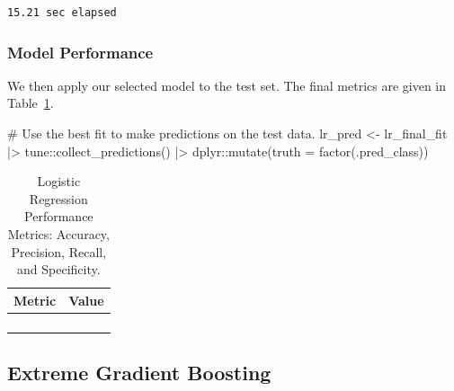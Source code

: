 \documentclass[
  letterpaper,
  DIV=11,
  numbers=noendperiod]{scrartcl}
\newenvironment{Shaded}{\begin{snugshade}}{\end{snugshade}}
\newcommand{\AttributeTok}[1]{\textcolor[rgb]{0.40,0.45,0.13}{#1}}
\newcommand{\CommentTok}[1]{\textcolor[rgb]{0.37,0.37,0.37}{#1}}
\newcommand{\FunctionTok}[1]{\textcolor[rgb]{0.28,0.35,0.67}{#1}}
\newcommand{\NormalTok}[1]{\textcolor[rgb]{0.00,0.23,0.31}{#1}}
\newcommand{\OtherTok}[1]{\textcolor[rgb]{0.00,0.23,0.31}{#1}}
\newcommand{\SpecialCharTok}[1]{\textcolor[rgb]{0.37,0.37,0.37}{#1}}
\begin{document}
\begin{verbatim}
15.21 sec elapsed
\end{verbatim}

\subsubsection{Model Performance}\label{model-performance-3}

We then apply our selected model to the test set. The final metrics are
given in Table~\ref{tbl-lr-performance-pdf}.

\begin{Shaded}
\begin{Highlighting}[]
\CommentTok{\# Use the best fit to make predictions on the test data.}
\NormalTok{lr\_pred }\OtherTok{\textless{}{-}} 
\NormalTok{  lr\_final\_fit }\SpecialCharTok{|\textgreater{}} 
\NormalTok{  tune}\SpecialCharTok{::}\FunctionTok{collect\_predictions}\NormalTok{() }\SpecialCharTok{|\textgreater{}}
\NormalTok{  dplyr}\SpecialCharTok{::}\FunctionTok{mutate}\NormalTok{(}\AttributeTok{truth =} \FunctionTok{factor}\NormalTok{(.pred\_class))}
\end{Highlighting}
\end{Shaded}

\begin{longtable}{>{\raggedright\arraybackslash}p{}>{\raggedleft\arraybackslash}p{}}

\caption{\label{tbl-lr-performance-pdf}Logistic Regression Performance
Metrics: Accuracy, Precision, Recall, and Specificity.}

\tabularnewline

\toprule
Metric & Value \\ 
\midrule\addlinespace[2.5pt]
\cellcolor[HTML]{FFFFFF}{Accuracy} & \cellcolor[HTML]{FFFFFF}{93.4} \\ 
\cellcolor[HTML]{FFFFFF}{Precision} & \cellcolor[HTML]{FFFFFF}{84.6} \\ 
\cellcolor[HTML]{FFFFFF}{Recall} & \cellcolor[HTML]{FFFFFF}{91.7} \\ 
\cellcolor[HTML]{FFFFFF}{Specificity} & \cellcolor[HTML]{FFFFFF}{94.0} \\ 
\bottomrule

\end{longtable}

\subsection{Extreme Gradient Boosting}\label{extreme-gradient-boosting}
\end{document}
